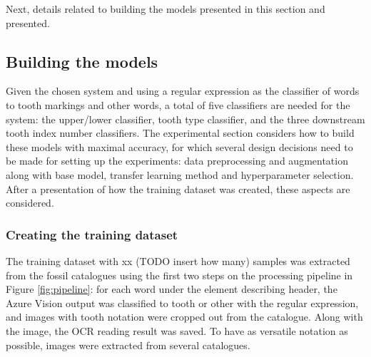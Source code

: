 \documentclass{article}
\begin{document}
Next, details related to building the models presented in this section and 
presented.

\subsection{Building the models}
\label{sect:building-models}


Given the chosen system and using a regular expression as the classifier of words to tooth markings 
and other words, a total of five classifiers are needed for the system: the upper/lower classifier, 
tooth type classifier, and the three downstream tooth index number classifiers. The experimental 
section considers how to build these models with maximal accuracy, for which several design decisions 
need to be made for setting up the experiments: data preprocessing and augmentation along with base model,
transfer learning method and hyperparameter selection. After a presentation of  how the training dataset was created, these aspects are considered.

\subsubsection{Creating the training dataset}

The training dataset with xx (TODO insert how many) samples was extracted from the fossil 
catalogues using the first two steps on the processing pipeline in Figure \ref{fig:pipeline}:
for each word under the element describing header, the Azure Vision output was classified 
to tooth or other with the regular expression, and 
images with tooth notation were cropped out from the catalogue. Along with the image, the 
OCR reading result was saved. To have as versatile notation as possible, images were 
extracted from several catalogues.  
\end{document}
